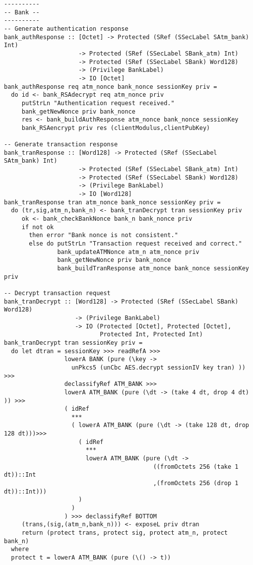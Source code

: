 \begin{Verbatim}[fontsize=\footnotesize,frame=lines,
                 framesep=5mm, label={[BankSystem.hs]BankSystem.hs}]
----------
-- Bank --
----------
-- Generate authentication response
bank_authResponse :: [Octet] -> Protected (SRef (SSecLabel SAtm_bank) Int) 
                     -> Protected (SRef (SSecLabel SBank_atm) Int)
                     -> Protected (SRef (SSecLabel SBank) Word128) 
                     -> (Privilege BankLabel)
                     -> IO [Octet]
bank_authResponse req atm_nonce bank_nonce sessionKey priv = 
  do id <- bank_RSAdecrypt req atm_nonce priv
     putStrLn "Authentication request received."
     bank_getNewNonce priv bank_nonce
     res <- bank_buildAuthResponse atm_nonce bank_nonce sessionKey 
     bank_RSAencrypt priv res (clientModulus,clientPubKey)

-- Generate transaction response
bank_tranResponse :: [Word128] -> Protected (SRef (SSecLabel SAtm_bank) Int)
                     -> Protected (SRef (SSecLabel SBank_atm) Int) 
                     -> Protected (SRef (SSecLabel SBank) Word128) 
                     -> (Privilege BankLabel)
                     -> IO [Word128]
bank_tranResponse tran atm_nonce bank_nonce sessionKey priv = 
  do (tr,sig,atm_n,bank_n) <- bank_tranDecrypt tran sessionKey priv
     ok <- bank_checkBankNonce bank_n bank_nonce priv
     if not ok
       then error "Bank nonce is not consistent."
       else do putStrLn "Transaction request received and correct."
               bank_updateATMNonce atm_n atm_nonce priv
               bank_getNewNonce priv bank_nonce 
               bank_buildTranResponse atm_nonce bank_nonce sessionKey priv

-- Decrypt transaction request
bank_tranDecrypt :: [Word128] -> Protected (SRef (SSecLabel SBank) Word128) 
                    -> (Privilege BankLabel)
                    -> IO (Protected [Octet], Protected [Octet], 
                           Protected Int, Protected Int)
bank_tranDecrypt tran sessionKey priv =
  do let dtran = sessionKey >>> readRefA >>>
                 lowerA BANK (pure (\key -> 
                   unPkcs5 (unCbc AES.decrypt sessionIV key tran) )) >>>
                 declassifyRef ATM_BANK >>>
                 lowerA ATM_BANK (pure (\dt -> (take 4 dt, drop 4 dt) )) >>>
                 ( idRef
                   ***
                   ( lowerA ATM_BANK (pure (\dt -> (take 128 dt, drop 128 dt)))>>>
                     ( idRef
                       ***
                       lowerA ATM_BANK (pure (\dt -> 
                                          ((fromOctets 256 (take 1 dt))::Int
                                          ,(fromOctets 256 (drop 1 dt))::Int)))
                     )
                   )
                 ) >>> declassifyRef BOTTOM
     (trans,(sig,(atm_n,bank_n))) <- exposeL priv dtran
     return (protect trans, protect sig, protect atm_n, protect bank_n)
  where
  protect t = lowerA ATM_BANK (pure (\() -> t))    


\end{Verbatim}
